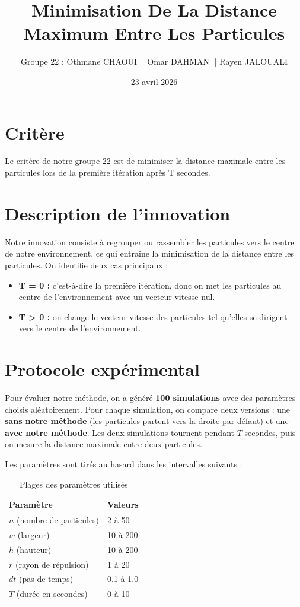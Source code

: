 \documentclass[twocolumn,11pt,a4paper]{article}
\title{Minimisation De La Distance Maximum Entre Les Particules}
\author{Groupe 22 : Othmane CHAOUI || Omar DAHMAN || Rayen JALOUALI}
\date{23 avril 2026}
\begin{document}
\maketitle

\section{Critère}

Le critère de notre groupe 22 est de minimiser la distance maximale entre les particules lors de la première itération après T secondes.

\section{Description de l'innovation}

Notre innovation consiste à regrouper ou rassembler les particules vers le centre de notre environnement, ce qui entraîne la minimisation de la distance entre les particules. On identifie deux cas principaux :\\
\begin{itemize}
    \item \textbf{T = 0 :} c'est-à-dire la première itération, donc on met les particules au centre de l'environnement avec un vecteur vitesse nul.
    \item \textbf{T > 0 :} on change le vecteur vitesse des particules tel qu'elles se dirigent vers le centre de l'environnement.
\end{itemize}

\section{Protocole expérimental}

Pour évaluer notre méthode, on a généré \textbf{100 simulations} avec des paramètres choisis aléatoirement. Pour chaque simulation, on compare deux versions : une \textbf{sans notre méthode} (les particules partent vers la droite par défaut) et une \textbf{avec notre méthode}. Les deux simulations tournent pendant $T$ secondes, puis on mesure la distance maximale entre deux particules.

Les paramètres sont tirés au hasard dans les intervalles suivants :

\begin{table}[H]
\centering
\caption{Plages des paramètres utilisés}
\small
\begin{tabular}{ll}
\toprule
Paramètre & Valeurs \\
\midrule
$n$ (nombre de particules) & 2 à 50 \\
$w$ (largeur)              & 10 à 200 \\
$h$ (hauteur)              & 10 à 200 \\
$r$ (rayon de répulsion)   & 1 à 20 \\
$dt$ (pas de temps)        & 0.1 à 1.0 \\
$T$ (durée en secondes)    & 0 à 10 \\
\bottomrule
\end{tabular}
\end{table}
\end{document}
